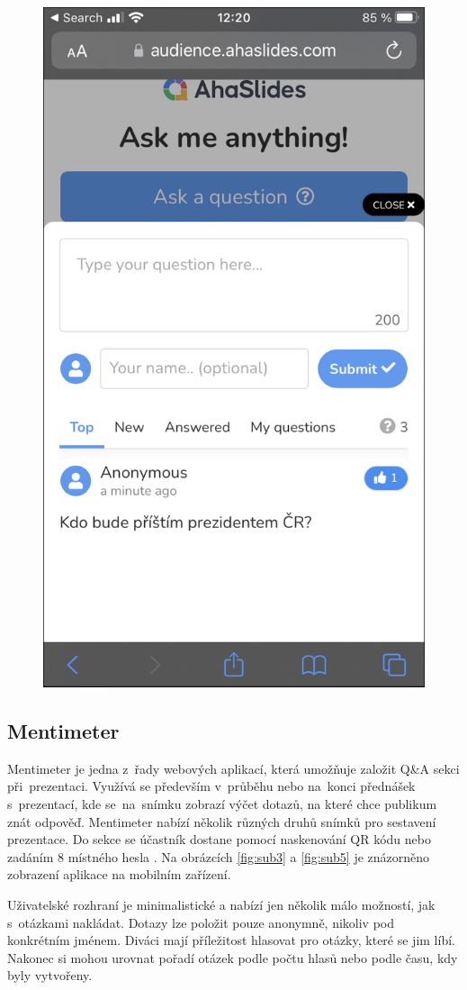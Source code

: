 \begin{figure}
\begin{minipage}{.5\textwidth}
  \includegraphics[width=.7\linewidth]{obrazky/aha_client.png}
  \label{fig:sub6}
\end{minipage}
\end{figure}

\subsection{Mentimeter}
Mentimeter je jedna z~řady webových aplikací, která umožňuje založit Q\&A sekci při~prezentaci. Využívá se především v~průběhu nebo na~konci přednášek s~prezentací, kde se~na~snímku zobrazí výčet dotazů, na které chce publikum znát odpověď. Mentimeter nabízí několik různých druhů snímků pro sestavení prezentace. Do sekce se účastník dostane pomocí naskenování QR kódu nebo zadáním 8 místného hesla \cite{mentimetersection}. Na obrázcích \ref{fig:sub3} a \ref{fig:sub5} je znázorněno zobrazení aplikace na mobilním zařízení. 

Uživatelské rozhraní je minimalistické a nabízí jen několik málo možností, jak s~otázkami nakládat. Dotazy lze položit pouze anonymně, nikoliv pod konkrétním jménem. 
Diváci mají příležitost hlasovat pro otázky, které se jim líbí. Nakonec si mohou urovnat pořadí otázek podle počtu hlasů nebo podle času, kdy byly vytvořeny.

